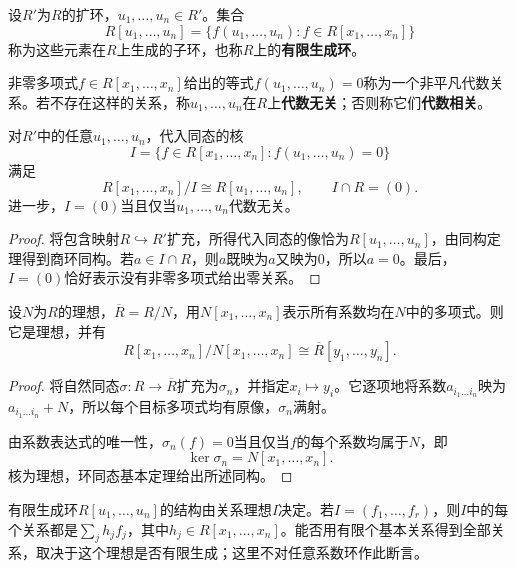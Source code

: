 \begin{definition}
设$R'$为$R$的扩环，$u_1,\ldots,u_n\in R'$。集合
\[
R[u_1,\ldots,u_n]
=\{f(u_1,\ldots,u_n):f\in R[x_1,\ldots,x_n]\}
\]
称为这些元素在$R$上生成的子环，也称$R$上的\textbf{有限生成环}。

非零多项式$f\in R[x_1,\ldots,x_n]$给出的等式$f(u_1,\ldots,u_n)=0$称为一个非平凡代数关系。若不存在这样的关系，称$u_1,\ldots,u_n$在$R$上\textbf{代数无关}；否则称它们\textbf{代数相关}。
\end{definition}

\begin{corollary}
对$R'$中的任意$u_1,\ldots,u_n$，代入同态的核
\[
I=\{f\in R[x_1,\ldots,x_n]:f(u_1,\ldots,u_n)=0\}
\]
满足
\[
R[x_1,\ldots,x_n]/I\cong R[u_1,\ldots,u_n],\qquad I\cap R=(0).
\]
进一步，$I=(0)$当且仅当$u_1,\ldots,u_n$代数无关。
\end{corollary}
\begin{proof}
将包含映射$R\hookrightarrow R'$扩充，所得代入同态的像恰为$R[u_1,\ldots,u_n]$，由同构定理得到商环同构。若$a\in I\cap R$，则$a$既映为$a$又映为$0$，所以$a=0$。最后，$I=(0)$恰好表示没有非零多项式给出零关系。
\end{proof}

\begin{proposition}
设$N$为$R$的理想，$\overline R=R/N$，用$N[x_1,\ldots,x_n]$表示所有系数均在$N$中的多项式。则它是理想，并有
\[
R[x_1,\ldots,x_n]/N[x_1,\ldots,x_n]
\cong\overline R[y_1,\ldots,y_n].
\]
\end{proposition}
\begin{proof}
将自然同态$\sigma:R\to\overline R$扩充为$\sigma_n$，并指定$x_i\mapsto y_i$。它逐项地将系数$a_{i_1\ldots i_n}$映为$a_{i_1\ldots i_n}+N$，所以每个目标多项式均有原像，$\sigma_n$满射。

由系数表达式的唯一性，$\sigma_n(f)=0$当且仅当$f$的每个系数均属于$N$，即
\[
\ker\sigma_n=N[x_1,\ldots,x_n].
\]
核为理想，环同态基本定理给出所述同构。
\end{proof}

有限生成环$R[u_1,\ldots,u_n]$的结构由关系理想$I$决定。若$I=(f_1,\ldots,f_r)$，则$I$中的每个关系都是$\sum_j h_jf_j$，其中$h_j\in R[x_1,\ldots,x_n]$。能否用有限个基本关系得到全部关系，取决于这个理想是否有限生成；这里不对任意系数环作此断言。
